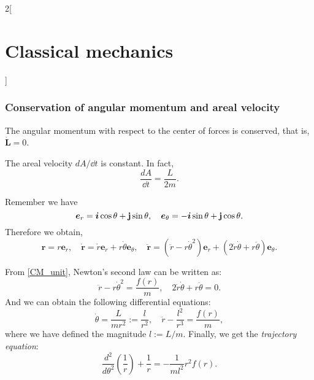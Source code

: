 \documentclass[../../../main.tex]{subfiles}
\begin{document}
\begin{multicols}{2}[\section{Classical mechanics}]
    \subsubsection{Conservation of angular momentum and areal velocity}
    \begin{prop}
        The angular momentum with respect to the center of forces is conserved, that is, $\dot{\boldsymbol{L}}=0$.
    \end{prop}
    \begin{prop}
        The areal velocity $dA/\dd t$ is constant. In fact, $$\frac{dA}{\dd t}=\frac{L}{2m}.$$
    \end{prop}
    \begin{prop}
        Remember we have $$\boldsymbol{e}_r=\boldsymbol{i}\cos\theta+\boldsymbol{\mathrm{j}}\sin\theta,\quad\boldsymbol{e}_\theta=-\boldsymbol{i}\sin\theta+\boldsymbol{\mathrm{j}}\cos\theta.$$ Therefore we obtain,
        \begin{equation}
            \boldsymbol{r}=r\boldsymbol{e}_r,\quad\boldsymbol{\dot{r}}=\dot{r}\boldsymbol{e}_r+r\dot{\theta}\boldsymbol{e}_\theta,\quad\boldsymbol{\ddot{r}}=(\ddot{r}-r\dot{\theta}^2)\boldsymbol{e}_r+(2\dot{r}\dot{\theta}+r\ddot{\theta})\boldsymbol{e}_\theta.
            \label{CM_unit}
        \end{equation}
    \end{prop}
    \begin{prop}
        From \cref{CM_unit}, Newton's second law can be written as: $$\ddot{r}-r\dot{\theta}^2=\frac{f(r)}{m},\quad 2\dot{r}\dot{\theta}+r\ddot{\theta}=0.$$ And we can obtain the following differential equations: $$\dot{\theta}=\frac{L}{m r^2}:=\frac{l}{r^2},\quad\ddot{r}-\frac{l^2}{r^3}=\frac{f(r)}{m},$$ where we have defined the magnitude $l:=L/m$. Finally, we get the \textit{trajectory equation}: $$\frac{d^2}{d\theta^2}\left(\frac{1}{r}\right)+\frac{1}{r}=-\frac{1}{ml^2}r^2f(r).$$
    \end{prop}

\end{multicols}
\end{document}
